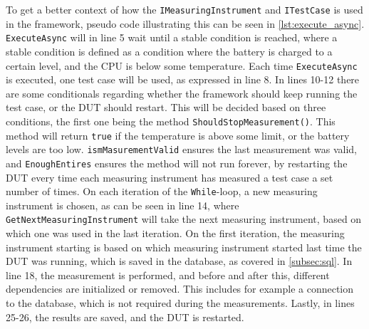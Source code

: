 To get a better context of how the \texttt{IMeasuringInstrument} and \texttt{ITestCase} is used in the framework, pseudo code illustrating this can be seen in \cref{lst:execute_async}. \texttt{ExecuteAsync} will in line 5 wait until a stable condition is reached, where a stable condition is defined as a condition where the battery is charged to a certain level, and the CPU is below some temperature. Each time \texttt{ExecuteAsync} is executed, one test case will be used, as expressed in line 8. In lines 10-12 there are some conditionals regarding whether the framework should keep running the test case, or the DUT should restart. This will be decided based on three conditions, the first one being the method \texttt{ShouldStopMeasurement()}. This method will return \texttt{true} if the temperature is above some limit, or the battery levels are too low. \texttt{ismMasurementValid} ensures the last measurement was valid, and \texttt{EnoughEntires} ensures the method will not run forever, by restarting the DUT every time each measuring instrument has measured a test case a set number of times. On each iteration of the \texttt{While}-loop, a new measuring instrument is chosen, as can be seen in line 14, where \texttt{GetNextMeasuringInstrument} will take the next measuring instrument, based on which one was used in the last iteration. On the first iteration, the measuring instrument starting is based on which measuring instrument started last time the DUT was running, which is saved in the database, as covered in \cref{subsec:sql}. In line 18, the measurement is performed, and before and after this, different dependencies are initialized or removed. This includes for example a connection to the database, which is not required during the measurements. Lastly, in lines 25-26, the results are saved, and the DUT is restarted. 



